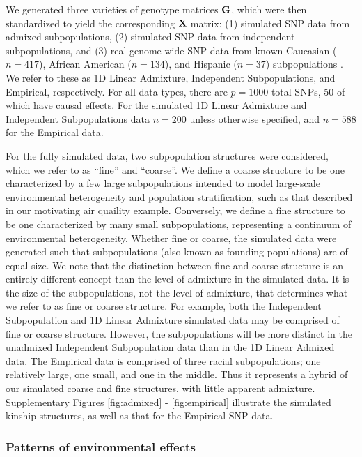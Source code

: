 We generated three varieties of genotype matrices $\mathbf{G}$, which were then standardized to yield the corresponding $\mathbf{X}$ matrix: (1) simulated SNP data from admixed subpopulations, (2) simulated SNP data from independent subpopulations, and (3) real genome-wide SNP data from known Caucasian ($n = 417$), African American ($n = 134$), and Hispanic ($n = 37$) subpopulations \citep{larkin2015objectives}. We refer to these as 1D Linear Admixture, Independent Subpopulations, and Empirical, respectively. For all data types, there are $p = 1000$ total SNPs, 50 of which have causal effects. For the simulated 1D Linear Admixture and Independent Subpopulations data $n = 200$ unless otherwise specified, and $n = 588$ for the Empirical data. 

For the fully simulated data, two subpopulation structures were considered, which we refer to as ``fine'' and ``coarse''.  We define a coarse structure to be one characterized by a few large subpopulations intended to model large-scale environmental heterogeneity and population stratification, such as that described in our motivating air quaility example. Conversely, we define a fine structure to be one characterized by many small subpopulations, representing a continuum of environmental heterogeneity. Whether fine or coarse, the simulated data were generated such that subpopulations (also known as founding populations) are of equal size. We note that the distinction between fine and coarse structure is an entirely different concept than the level of admixture in the simulated data. It is the size of the subpopulations, not the level of admixture, that determines what we refer to as fine or coarse structure. For example, both the Independent Subpopulation and 1D Linear Admixture simulated data may be comprised of fine or coarse structure. However, the subpopulations will be more distinct in the unadmixed Independent Subpopulation data than in the 1D Linear Admixed data. The Empirical data is comprised of three racial subpopulations; one relatively large, one small, and one in the middle. Thus it represents a hybrid of our simulated coarse and fine structures, with little apparent admixture. Supplementary Figures \ref{fig:admixed} - \ref{fig:empirical} illustrate the simulated kinship structures, as well as that for the Empirical SNP data. 

\subsubsection{Patterns of environmental effects}

